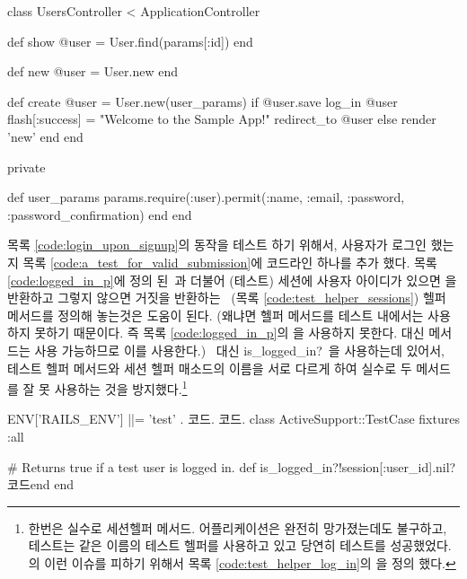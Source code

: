 \begin{codelisting} \label{code:login_upon_signup}  

\begin{code} class UsersController < ApplicationController 

def show @user = User.find(params[:id]) end 

def new @user = User.new end 

def create @user = User.new(user_params) if @user.save log_in @user flash[:success] = "Welcome to the Sample App!" redirect_to @user else render 'new' end end 

private 

def user_params params.require(:user).permit(:name, :email, :password, :password_confirmation) end end \end{code} \end{codelisting} 

목록 \ref{code:login_upon_signup}의 동작을 테스트 하기 위해서, 사용자가 로그인 했는지 목록 \ref{code:a_test_for_valid_submission}에 코드라인 하나를 추가 했다. 목록 \ref{code:logged_in_p}에 정의 된\ 과 더불어 (테스트) 세션에 사용자 아이디가 있으면 을 반환하고 그렇지 않으면 거짓을 반환하는 \ (목록 \ref{code:test_helper_sessions}) 헬퍼 메서드를 정의해 놓는것은 도움이 된다. (왜냐면 헬퍼 메서드를 테스트 내에서는 사용하지 못하기 때문이다. 즉 목록 \ref{code:logged_in_p}의 을 사용하지 못한다. 대신  메서드는 사용 가능하므로 이를 사용한다.) \kode{}\ 대신 {is\_logged\_in?}\ 을 사용하는데 있어서, 테스트 헬퍼 메서드와 세션 헬퍼 매소드의 이름을 서로 다르게 하여 실수로 두 메서드를 잘 못 사용하는 것을 방지했다.\footnote{한번은 실수로  세션헬퍼 메서드. 어플리케이션은 완전히 망가졌는데도 불구하고, 테스트는 같은 이름의 테스트 헬퍼를 사용하고 있고 당연히 테스트를 성공했었다. 의 이런 이슈를 피하기 위해서 목록 \ref{code:test_helper_log_in}의 을 정의 했다.} 

\begin{codelisting} \label{code:test_helper_sessions}  

\begin{code} ENV['RAILS_ENV'] ||= 'test' . 코드. 코드. class ActiveSupport::TestCase fixtures :all 

# Returns true if a test user is logged in. def is_logged_in?!session[:user_id].nil?코드end end \end{code} \end{codelisting} 

